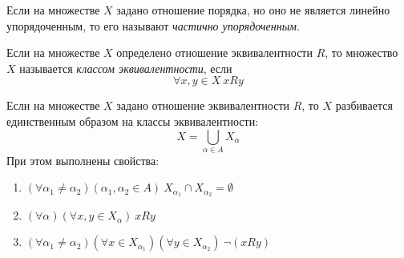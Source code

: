 \begin{definition}
    Если на множестве $X$ задано отношение порядка, но оно не является линейно упорядоченным, то его называют \textit{частично упорядоченным}.
\end{definition}

\begin{definition}
    Если на множестве $X$ определено отношение эквивалентности $R$, то множество $X$ называется \textit{классом эквивалентности}, если
    \[
    	\forall x, y \in X\ xRy
    \]
\end{definition}

\begin{theorem}
    Если на множестве $X$ задано отношение эквивалентности $R$,
    то $X$ разбивается единственным образом на классы эквивалентности:
    $$
        X = \bigcup\limits_{\alpha \in A} X_{\alpha}
    $$
    При этом выполнены свойства:
    \begin{enumerate}
        \item $(\forall \alpha_1 \neq \alpha_2)(\alpha_1, \alpha_2 \in A) \ X_{\alpha_1} \cap X_{\alpha_2} = \emptyset$
        \item $(\forall \alpha)(\forall x, y \in X_{\alpha})\ xRy$
        \item $(\forall \alpha_1 \neq \alpha_2)(\forall x \in X_{\alpha_1})(\forall y \in X_{\alpha_2})\ \neg (xRy)$
    \end{enumerate}
\end{theorem}